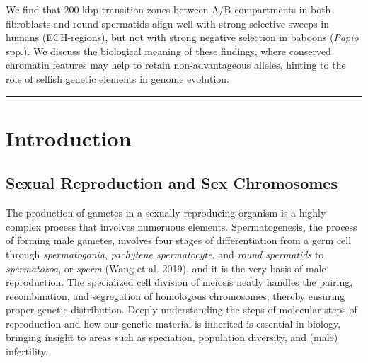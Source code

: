 \documentclass[
  11pt,
  a4paper,
]{scrbook}
\let\oldemph\emph
\renewcommand\emph[1]{\oldemph{\color{gray}#1}}
\renewcommand*\contentsname{Table of contents}
\newcommand\contentsname{Table of contents}
\begin{document}
{\begin{minipage}{.8\textwidth}
We find that 200 kbp transition-zones between A/B-compartments in both
fibroblasts and round spermatids align well with strong selective sweeps
in humans (ECH-regions), but not with strong negative selection in
baboons (\emph{Papio} spp.). We discuss the biological meaning of these
findings, where conserved chromatin features may help to retain
non-advantageous alleles, hinting to the role of selfish genetic
elements in genome evolution. %
    \par %
    \vspace{2em} %
    \hspace*{\fill}\rule{0.5\textwidth}{0.4pt}\hspace*{\fill} %
\end{minipage}
\vspace*{\fill} %

}
\renewcommand*\contentsname{Table of contents}
{
\setcounter{tocdepth}{2}
\tableofcontents
}

\mainmatter
\chapter{Introduction}\label{introduction}

\section{Sexual Reproduction and Sex
Chromosomes}\label{sexual-reproduction-and-sex-chromosomes}

The production of gametes in a sexually reproducing organism is a highly
complex process that involves numeruous elements. Spermatogenesis, the
process of forming male gametes, involves four stages of differentiation
from a germ cell through \emph{spermatogonia}, \emph{pachytene
spermatocyte}, and \emph{round spermatids} to \emph{spermatozoa}, or
\emph{sperm} (Wang et al. 2019), and it is the very basis of male
reproduction. The specialized cell division of meiosis neatly handles
the pairing, recombination, and segregation of homologous chromosomes,
thereby ensuring proper genetic distribution. Deeply understanding the
steps of molecular steps of reproduction and how our genetic material is
inherited is essential in biology, bringing insight to areas such as
speciation, population diversity, and (male) infertility.
\end{document}
